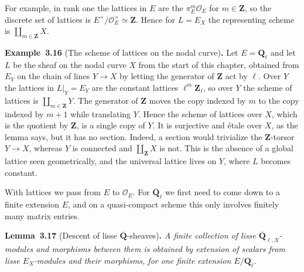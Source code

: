 \documentclass[11pt]{article}
\newenvironment{bpstatement}[2]{\par\addvspace{0.6\baselineskip}\noindent\textbf{#1}#2\textbf{.}\enspace\ignorespaces}
  {\par\addvspace{0.4\baselineskip}}
\newenvironment{bpstatementit}[2]{\begin{bpstatement}{#1}{#2}\itshape\ignorespaces}{\end{bpstatement}}
\providecommand{\Qbar}{}\renewcommand{\Qbar}{\overline{\mathbf Q}}
\providecommand{\QbarX}{}\renewcommand{\QbarX}{\overline{\mathbf Q}_{\ell,X}}
\begin{document}
\label{bp50}%
For example, in rank one the lattices in \(E\) are the \(\pi_E^m\mathcal O_E\) for \(m\in\mathbf Z\), so the discrete set of lattices is \(E^\times/\mathcal O_E^\times\simeq\mathbf Z\). Hence for \(L=E_X\) the representing scheme is \(\coprod_{m\in\mathbf Z}X\).

\label{bp51}%
\begin{bpstatement}{Example~3.16}{ (The scheme of lattices on the nodal curve)}
Let \(E=\mathbf Q_\ell\) and let \(L\) be the sheaf on the nodal curve \(X\) from the start of this chapter, obtained from \(E_Y\) on the chain of lines \(Y\to X\) by letting the generator of \(\mathbf Z\) act by \(\ell\). Over \(Y\) the lattices in \(L|_Y=E_Y\) are the constant lattices \(\ell^m\mathbf Z_\ell\), so over \(Y\) the scheme of lattices is \(\coprod_{m\in\mathbf Z}Y\). The generator of \(\mathbf Z\) moves the copy indexed by \(m\) to the copy indexed by \(m+1\) while translating \(Y\). Hence the scheme of lattices over \(X\), which is the quotient by \(\mathbf Z\), is a single copy of \(Y\). It is surjective and étale over \(X\), as the lemma says, but it has no section. Indeed, a section would trivialize the \(\mathbf Z\)-torsor \(Y\to X\), whereas \(Y\) is connected and \(\coprod_{\mathbf Z}X\) is not. This is the absence of a global lattice seen geometrically, and the universal lattice lives on \(Y\), where \(L\) becomes constant.
\end{bpstatement}

\label{bp52}%
With lattices we pass from \(E\) to \(\mathcal O_E\). For \(\overline{\mathbf Q}_\ell\) we first need to come down to a finite extension \(E\), and on a quasi-compact scheme this only involves finitely many matrix entries.

\label{bp53}%
\begin{bpstatementit}{Lemma~3.17}{ (Descent of lisse $\Qbar$-sheaves)}
A finite collection of lisse \(\QbarX\)-modules and morphisms between them is obtained by extension of scalars from lisse \(E_X\)-modules and their morphisms, for one finite extension \(E/\mathbf Q_\ell\).
\end{bpstatementit}
\end{document}
